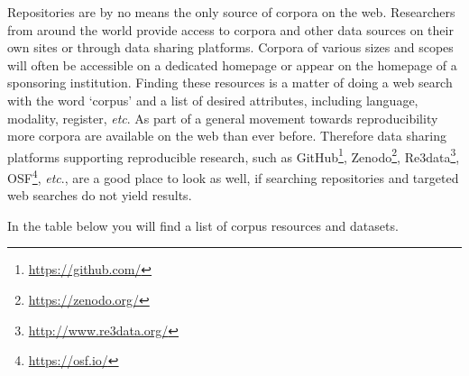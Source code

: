 \documentclass[
  letterpaper,
]{scrbook}
\DeclareRobustCommand{\href}[2]{#2\footnote{\url{#1}}}
\begin{document}
Repositories are by no means the only source of corpora on the web.
Researchers from around the world provide access to corpora and other
data sources on their own sites or through data sharing platforms.
Corpora of various sizes and scopes will often be accessible on a
dedicated homepage or appear on the homepage of a sponsoring
institution. Finding these resources is a matter of doing a web search
with the word `corpus' and a list of desired attributes, including
language, modality, register, \emph{etc}. As part of a general movement
towards reproducibility more corpora are available on the web than ever
before. Therefore data sharing platforms supporting reproducible
research, such as \href{https://github.com/}{GitHub},
\href{https://zenodo.org/}{Zenodo},
\href{http://www.re3data.org/}{Re3data}, \href{https://osf.io/}{OSF},
\emph{etc}., are a good place to look as well, if searching repositories
and targeted web searches do not yield results.

In the table below you will find a list of corpus resources and
datasets.
\end{document}
